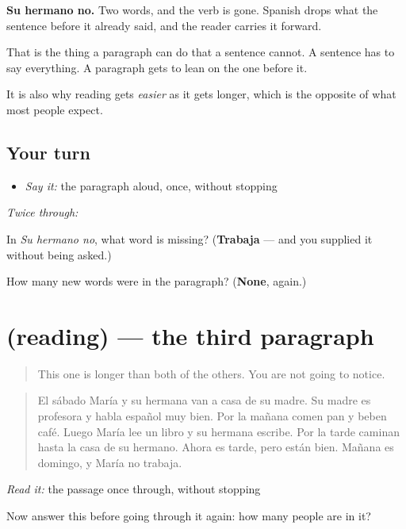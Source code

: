 \begin{culture}
\textbf{Su hermano no.} Two words, and the verb is gone. Spanish drops what the sentence before it already said, and the reader carries it forward.

That is the thing a paragraph can do that a sentence cannot. A sentence has to say everything. A paragraph gets to lean on the one before it.

It is also why reading gets \emph{easier} as it gets longer, which is the opposite of what most people expect.
\end{culture}

\subsection*{Your turn}
\begin{itemize}
\raggedright
  \item \emph{Say it:} the paragraph aloud, once, without stopping
\end{itemize}

\emph{Twice through:}

\begin{tcolorbox}[breakable,colback=teal!4,colframe=teal!35!black,title={Before you move on}]
In \emph{Su hermano no}, what word is missing? (\textbf{Trabaja} — and you supplied it without being asked.)

How many new words were in the paragraph? (\textbf{None}, again.)
\end{tcolorbox}
\section[(reading)]{(reading) — the third paragraph}

\label{lesson:ES-C67-tercera-lectura}



\begin{quote}
This one is longer than both of the others. You are not going to notice.
\end{quote}

\begin{tcolorbox}[breakable,skin=enhanced,colback=orange!6,colframe=orange!45!black,boxrule=0.5pt,arc=1mm,left=6pt,right=6pt,top=4pt,bottom=4pt,fonttitle=\bfseries,title={Read this}]
\begin{quote}
El sábado María y su hermana van a casa de su madre. Su madre es profesora y habla español muy bien. Por la mañana comen pan y beben café. Luego María lee un libro y su hermana escribe. Por la tarde caminan hasta la casa de su hermano. Ahora es tarde, pero están bien. Mañana es domingo, y María no trabaja.
\end{quote}

\emph{Read it:} the passage once through, without stopping

Now answer this before going through it again: how many people are in it?
\end{tcolorbox}

